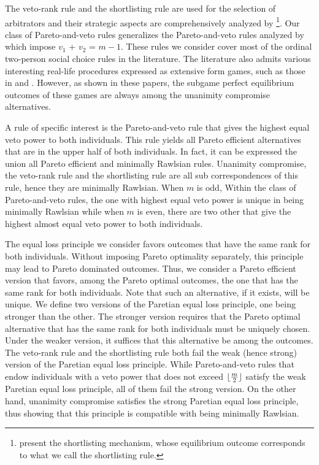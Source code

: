 \documentclass[pagesize, twoside=off, bibliography=totoc, DIV=calc, fontsize=12pt, a4paper]{scrartcl}
\begin{document}
The veto-rank rule and the shortlisting rule are used for the selection of arbitrators and their strategic aspects are comprehensively analyzed by \citet{Clippel}%
\footnote{ present the shortlisting mechanism, whose equilibrium outcome corresponds to what we call the shortlisting rule.}. Our class of Pareto-and-veto rules generalizes the Pareto-and-veto rules analyzed by \citet{laslier2021solution} which impose $v_1$ + $v_2$ = $m-1$. These rules we consider cover most of the ordinal two-person social choice rules in the literature. The literature also admits various interesting real-life procedures expressed as extensive form games, such as those in \citet{anbarci1993noncooperative, anbarci2006finite} and \citet{barbera2022compromising}. However, as shown in these papers, the subgame perfect equilibrium outcomes of these games are always among the unanimity compromise alternatives. 

A rule of specific interest is the Pareto-and-veto rule that gives the highest equal veto power to both individuals. This rule yields all Pareto efficient alternatives that are in the upper half of both individuals. In fact, it can be expressed the union all Pareto efficient and minimally Rawlsian rules. Unanimity compromise, the veto-rank rule and the shortlisting rule are all sub correspondences of this rule, hence they are minimally Rawlsian. When $m$ is odd, Within the class of Pareto-and-veto rules, the one with highest equal veto power is unique in being minimally Rawlsian while when $m$ is even, there are two other that give the highest almost equal veto power to both individuals.

The equal loss principle we consider favors outcomes that have the same rank for both individuals. Without imposing Pareto optimality separately, this principle may lead to Pareto dominated outcomes. Thus, we consider a Pareto efficient version that favors, among the Pareto optimal outcomes, the one that has the same rank for both individuals. Note that such an alternative, if it exists, will be unique. We define two versions of the Paretian equal loss principle, one being stronger than the other. The stronger version requires that the Pareto optimal alternative that has the same rank for both individuals must be uniquely chosen. Under the weaker version, it suffices that this alternative be among the outcomes. The veto-rank rule and the shortlisting rule both fail the weak (hence strong) version of the Paretian equal loss principle. While Pareto-and-veto rules that endow individuals with a veto power that does not exceed $\lfloor\frac{m}{2}\rfloor$ satisfy the weak Paretian equal loss principle, all of them fail the strong version. On the other hand, unanimity compromise satisfies the strong Paretian equal loss principle, thus showing that this principle is compatible with being minimally Rawlsian.
 
\end{document}
